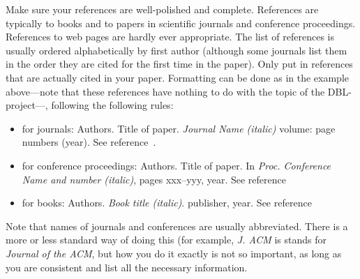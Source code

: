 \documentclass[11pt]{article}
\begin{document}
Make sure your references are well-polished and complete.
References are typically to books and to papers in scientific
journals and conference proceedings. References to web pages are hardly
ever appropriate.
The list of references is usually ordered alphabetically by first author (although some journals
list them in the order they are cited for the first time in the paper).
Only put in references that are actually cited in your paper.
Formatting can be done as in the example above---note that these references have
nothing to do with the topic of the DBL-project---, following the following rules:
\begin{itemize}
\item for journals:
      Authors. Title of paper. \emph{Journal Name (italic)} volume: page numbers (year).
      See reference~\cite{m-apca-83}.
\item for conference proceedings:
      Authors. Title of paper. In \emph{Proc. Conference Name and number (italic)}, pages xxx--yyy, year.
      See reference~\cite{a-raoa-02}
\item for books: Authors. \emph{Book title (italic)}. publisher, year.
      See reference~\cite{clrs-ia-01}
\end{itemize}
Note that names of journals and conferences are usually abbreviated. There is a more
or less standard way of doing this (for example, \emph{J. ACM} is stands for \emph{Journal of the ACM},
but how you do it exactly is not so important,
as long as you are consistent and list all the necessary information.
\end{document}
